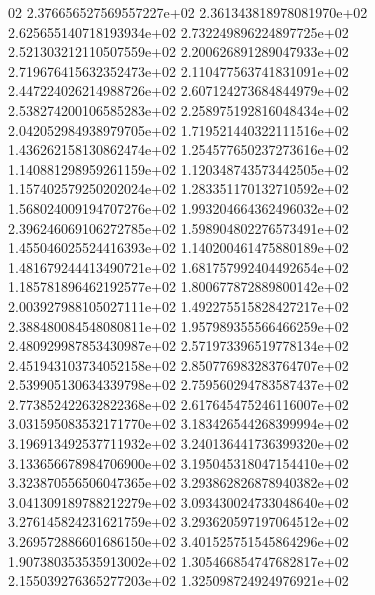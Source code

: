 02	2.376656527569557227e+02	2.361343818978081970e+02	2.625655140718193934e+02	2.732249896224897725e+02	2.521303212110507559e+02	2.200626891289047933e+02	2.719676415632352473e+02	2.110477563741831091e+02	2.447224026214988726e+02	2.607124273684844979e+02	2.538274200106585283e+02	2.258975192816048434e+02	2.042052984938979705e+02	1.719521440322111516e+02	1.436262158130862474e+02	1.254577650237273616e+02	1.140881298959261159e+02	1.120348743573442505e+02	1.157402579250202024e+02	1.283351170132710592e+02	1.568024009194707276e+02	1.993204664362496032e+02	2.396246069106272785e+02	1.598904802276573491e+02	1.455046025524416393e+02	1.140200461475880189e+02	1.481679244413490721e+02	1.681757992404492654e+02	1.185781896462192577e+02	1.800677872889800142e+02	2.003927988105027111e+02	1.492275515828427217e+02	2.388480084548080811e+02	1.957989355566466259e+02	2.480929987853430987e+02	2.571973396519778134e+02	2.451943103734052158e+02	2.850776983283764707e+02	2.539905130634339798e+02	2.759560294783587437e+02	2.773852422632822368e+02	2.617645475246116007e+02	3.031595083532171770e+02	3.183426544268399994e+02	3.196913492537711932e+02	3.240136441736399320e+02	3.133656678984706900e+02	3.195045318047154410e+02	3.323870556506047365e+02	3.293862826878940382e+02	3.041309189788212279e+02	3.093430024733048640e+02	3.276145824231621759e+02	3.293620597197064512e+02	3.269572886601686150e+02	3.401525751545864296e+02	1.907380353535913002e+02	1.305466854747682817e+02	2.155039276365277203e+02	1.325098724924976921e+02
